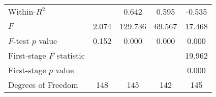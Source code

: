 \begin{tabular}{lcccc}
Within-$R^2$              &          &   0.642  &   0.595   &             -0.535             \\ 
$F$                       &   2.074  &  129.736 &   69.567  &             17.468             \\ 
$F$-test $p$ value        &   0.152  &   0.000  &   0.000   &              0.000             \\ 
First-stage $F$ statistic &          &          &           &             19.962             \\ 
First-stage $p$ value     &          &          &           &              0.000             \\ 
Degrees of Freedom        &    148   &    145   &    142    &               145              \\ 
\bottomrule
\end{tabular}

